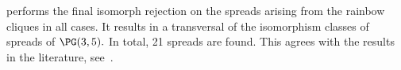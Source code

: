 
performs the final isomorph rejection on the spreads arising from the 
rainbow cliques in all cases. 
It results in a transversal of the isomorphism classes 
of spreads of $\PG(3,5).$ 
In total, 21 spreads are found. 
This agrees with the results in the literature, 
see~\cite{CzerwinskiOakden92}.






\bigskip





%

